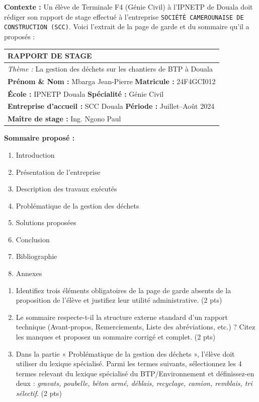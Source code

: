 \documentclass[11pt]{article}
\begin{document}
\begin{exercice}
    \textbf{Contexte :} Un élève de Terminale F4 (Génie Civil) à l'IPNETP de Douala doit rédiger son rapport de stage effectué à l'entreprise \texttt{SOCIÉTÉ CAMEROUNAISE DE CONSTRUCTION (SCC)}. Voici l'extrait de la page de garde et du sommaire qu'il a proposés :
    
    \begin{center}
    \begin{tabularx}{\linewidth}{|X|}
    \hline
    \textbf{RAPPORT DE STAGE} \\ \hline
    \textit{Thème :} La gestion des déchets sur les chantiers de BTP à Douala \\ \hline
    \textbf{Prénom \& Nom :} Mbarga Jean-Pierre \quad \textbf{Matricule :} 24F4GCI012 \\ \hline
    \textbf{École :} IPNETP Douala \quad \textbf{Spécialité :} Génie Civil \\ \hline
    \textbf{Entreprise d'accueil :} SCC Douala \quad \textbf{Période :} Juillet--Août 2024 \\ \hline
    \textbf{Maître de stage :} Ing. Ngono Paul \\ \hline
    \end{tabularx}
    \end{center}
    
    \vspace{0.2cm}
    \textbf{Sommaire proposé :}
    \begin{enumerate}
        \item Introduction
        \item Présentation de l'entreprise
        \item Description des travaux exécutés
        \item Problématique de la gestion des déchets
        \item Solutions proposées
        \item Conclusion
        \item Bibliographie
        \item Annexes
    \end{enumerate}
    
    \begin{enumerate}
        \item Identifiez trois éléments obligatoires de la page de garde absents de la proposition de l'élève et justifiez leur utilité administrative. (2 pts)
        \item Le sommaire respecte-t-il la structure externe standard d'un rapport technique (Avant-propos, Remerciements, Liste des abréviations, etc.) ? Citez les manques et proposez un sommaire corrigé et complet. (2 pts)
        \item Dans la partie « Problématique de la gestion des déchets », l'élève doit utiliser du lexique spécialisé. Parmi les termes suivants, sélectionnez les 4 termes relevant du lexique spécialisé du BTP/Environnement et définissez-en deux : \textit{gravats, poubelle, béton armé, déblais, recyclage, camion, remblais, tri sélectif}. (2 pts)
    \end{enumerate}
\end{exercice}
\end{document}
